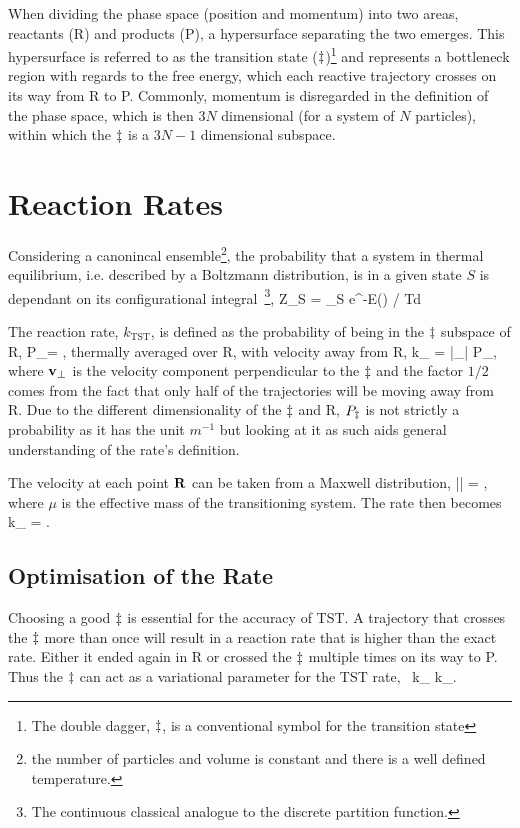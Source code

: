 When dividing the phase space (position and momentum) into two areas, reactants (R) and products (P), a hypersurface separating the two emerges.
This hypersurface is referred to as the transition state ($\ddagger$)\footnote{The double dagger, $\ddagger$, is a conventional symbol for the transition state} and represents a bottleneck region with regards to the free energy, which each reactive trajectory crosses on its way from R to P.
Commonly, momentum is disregarded in the definition of the phase space, which is then $3N$ dimensional (for a system of $N$ particles), within which the $\ddagger$ is a $3N-1$ dimensional subspace.

\section{Reaction Rates}
Considering a canonincal ensemble\footnote{the number of particles and volume is constant and there is a well defined temperature.}, the probability that a system in thermal equilibrium, i.e. described by a Boltzmann distribution, is in a given state $S$ is dependant on its configurational integral~\footnote{The continuous classical analogue to the discrete partition function.},
Z_S = \int_S e^{-E(\vR) / \kB T}d\vR
\eeq

The reaction rate, $k_\text{TST}$, is defined as the probability of being in the $\ddagger$ subspace of $\text{R}$,
P_\ts = ,
\eeq
thermally averaged over R, with velocity away from R,\citemiss
{}
k_ = |_\perp| P_\ts,
\eeq
where ${\mathrm{\mathbf{\bm{v}}}}_\perp$ is the velocity component perpendicular to the $\ddagger$ and the factor $1/2$ comes from the fact that only half of the trajectories will be moving away from R.
Due to the different dimensionality of the $\ddagger$ and R, $P_\ddagger$ is not strictly a probability as it has the unit $\unit{m^{-1}}$ but looking at it as such aids general understanding of the rate's definition.

The velocity at each point ${\mathrm{\mathbf{\bm{R}}}}$ can be taken from a Maxwell distribution,
\langle || \rangle = ,
\eeq
where $\mu$ is the effective mass of the transitioning system.
The rate then becomes
k_ =  .
\eeq

\subsection{Optimisation of the Rate}
Choosing a good $\ddagger$ is essential for the accuracy of TST.
A trajectory that crosses the $\ddagger$ more than once will result in a reaction rate that is higher than the exact rate.
Either it ended again in R or crossed the $\ddagger$ multiple times on its way to P.
Thus the $\ddagger$ can act as a variational parameter for the TST rate,~\cite{vtst-1938, vtst-review-1984, vtst-2005}
k_ \ge k_.
\eeq

